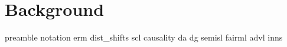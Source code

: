 \chapter{Background}\label{ch:background}
{preamble}
{notation}
{erm}
{dist_shifts}
{scl}
{causality}
{da}
{dg}
{semisl}
{fairml}
{advl}
{inns}

